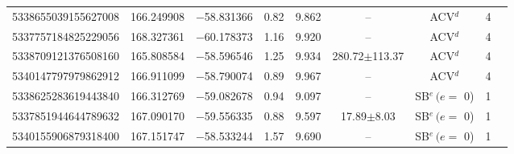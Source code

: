 \documentclass[11pt]{article}
\begin{document}
\begin{table}[htbp]
{\begin{tabular}{ccccccccc}
        5338655039155627008 & 166.249908 & $-$58.831366 & 0.82 & 9.862 & -- &  ACV$^d$ & 4 \\ 
        5337757184825229056 & 168.327361 & $-$60.178373 & 1.16 & 9.920 & -- &  ACV$^d$ & 4 \\ 
        5338709121376508160 & 165.808584 & $-$58.596546 & 1.25 & 9.934 & 280.72$\pm$113.37  & ACV$^d$ & 4 \\ 
        5340147797979862912 & 166.911099 & $-$58.790074 & 0.89 & 9.967 & -- &  ACV$^d$ & 4 \\ 
        5338625283619443840 & 166.312769 & $-$59.082678 & 0.94 & 9.097 & -- &  SB$^e\, (e =$ 0) & 1 \\ 
        5337851944644789632 & 167.090170 & $-$59.556335 & 0.88 & 9.597 & 17.89$\pm$8.03 &  SB$^e\, (e =$ 0) & 1 \\ 
        5340155906879318400 & 167.151747 & $-$58.533244 & 1.57 & 9.690 & -- &  SB$^e\, (e =$ 0) & 1 \\ \hline
    \end{tabular}
}
\end{table}
\end{document}
